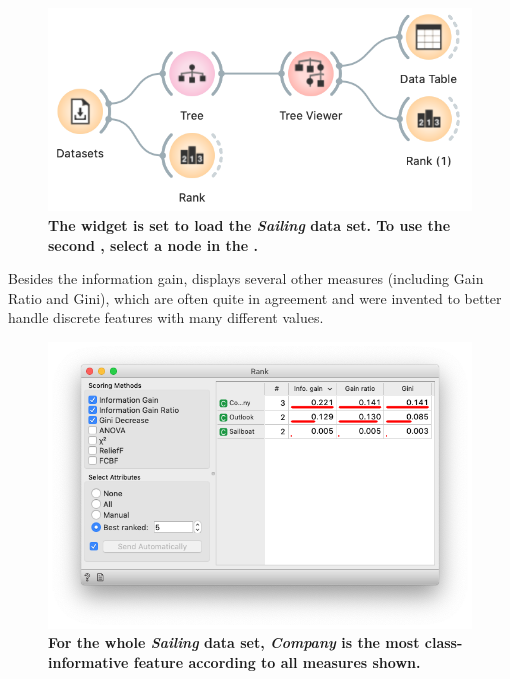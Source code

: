 \begin{figure}[h]
    \centering
    \includegraphics[scale=0.4]{workflow-rank.png}
    \caption{\textbf{\textsf{The  widget is set to load the \textit{Sailing} data set. To use the second , select a node in the .}}}
\end{figure}

Besides the information gain,  displays several other measures (including Gain Ratio and Gini), which are often quite in agreement and were invented to better handle discrete features with many different values.

\begin{figure}[h]
    \centering
    \vspace{-0.2cm}
    \includegraphics[scale=0.4]{rank.png}
    \caption{\textbf{\textsf{For the whole \textit{Sailing} data set, \textit{Company} is the most class-informative feature according to all measures shown.}}}
\end{figure}

\newpage

